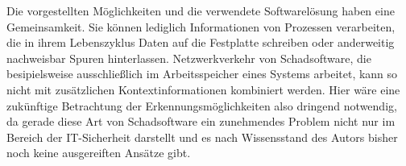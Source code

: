 Die vorgestellten Möglichkeiten und die verwendete Softwarelösung haben eine Gemeinsamkeit. Sie können lediglich Informationen von Prozessen verarbeiten, die in ihrem Lebenszyklus Daten auf die Festplatte schreiben oder anderweitig nachweisbar Spuren hinterlassen. Netzwerkverkehr von Schadsoftware, die besipielsweise ausschließlich im Arbeitsspeicher eines Systems arbeitet, kann so nicht mit zusätzlichen Kontextinformationen kombiniert werden. Hier wäre eine zukünftige Betrachtung der Erkennungsmöglichkeiten also dringend notwendig, da gerade diese Art von Schadsoftware ein zunehmendes Problem nicht nur im Bereich der IT-Sicherheit darstellt und es nach Wissensstand des Autors bisher noch keine  ausgereiften Ansätze gibt.
